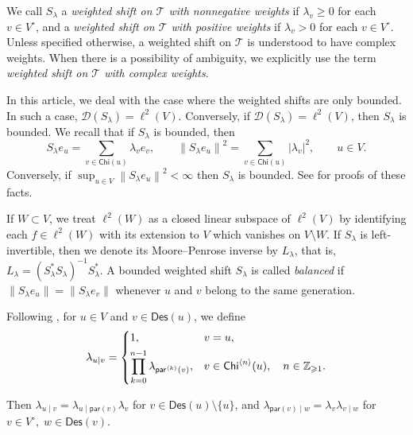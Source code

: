 \documentclass[11pt, reqno, a4paper]{amsart}
\theoremstyle{definition}
\newcommand{\scrT}{{\mathscr T}}
\newcommand{\norm}[1]{\left\lVert #1 \right\rVert}
\newcommand{\abs}[1]{\left\lvert #1 \right\rvert}
\renewcommand{\ge}{\geqslant}
\renewcommand{\geq}{\geqslant}
\newcommand{\Z}{\mathbb Z}
\newcommand{\Chi}{\mathsf{Chi}}
\newcommand{\pr}{\mathsf{par}}
\numberwithin{equation}{section}
\begin{document}
We call $S_{\lambda}$ a \textit{weighted shift on $\scrT$ with nonnegative weights} if $\lambda_v\geq 0$ for each $v\in V^{\circ}$, and a \textit{weighted shift on $\scrT$ with positive weights} if $\lambda_v>0$ for each $v\in V^{\circ}$. Unless specified otherwise, a weighted shift on $\scrT$ is understood to have complex weights. When there is a possibility of ambiguity, we explicitly use the term \textit{weighted shift on $\scrT$ with complex weights}.

In this article, we deal with the case where the weighted shifts are only bounded. In such a case, $\mathscr D(S_{\lambda }) = \ell ^2( V)$. Conversely, if $\mathscr D(S_\lambda)=\ell^2( V)$, then $S_\lambda$ is bounded. We recall that if $S_{\lambda}$ is bounded, then 
\begin{equation*}
    S_{\lambda}e_u = \sum_{v\in \Chi (u)} \lambda_v e_v, \qquad \norm{S_{\lambda} e_u}^{2} = \sum_{v\in \Chi (u)} \abs{\lambda_v}^{2}, \qquad u \in  V.
\end{equation*}
Conversely, if $\sup_{u \in  V} \norm{S_{\lambda} e_u}^{2} < \infty$ then $S_{\lambda}$ is bounded. See \cite[Proposition 3.1.3 and Proposition 3.1.8]{MR2919910} for proofs of these facts.

If $W \subset V$, we treat $\ell^2(W)$ as a closed linear subspace of $\ell^2(V)$ by identifying each $f\in\ell^2(W)$ with its extension to $V$ which vanishes on $V\setminus W$. If $S_{\lambda}$ is left-invertible, then we denote its Moore--Penrose inverse by $L_{\lambda}$, that is, $L_{\lambda} = (S_{\lambda}^{*} S_{\lambda})^{-1} S_{\lambda}^{*}$. A bounded weighted shift $S_{\lambda}$ is called \textit{balanced} if $\norm{S_{\lambda} e_u} = \norm{S_{\lambda} e_v}$ whenever $u$ and $v$ belong to the same generation.

Following \cite[Section 6.1]{MR2919910}, for $u\in V$ and $v\in\mathsf{Des}(u)$, we define
\begin{equation*}
\lambda_{u\mid v} = \begin{dcases}
1, & v=u,\\
\prod_{k=0}^{n-1} \lambda_{\pr^{\langle k\rangle}(v)}, & v\in\Chi^{\langle n\rangle}(u),\quad n\in \Z_{\ge 1}.
\end{dcases}
\end{equation*}

Then $\lambda_{u\mid v}=\lambda_{u\mid\pr(v)}\lambda_v$ for $v\in\mathsf{Des}(u)\setminus\{u\}$, and $\lambda_{\pr(v)\mid w}=\lambda_v\lambda_{v\mid w}$ for $v \in V^{\circ}, \; w\in\mathsf{Des}(v)$.
\end{document}
